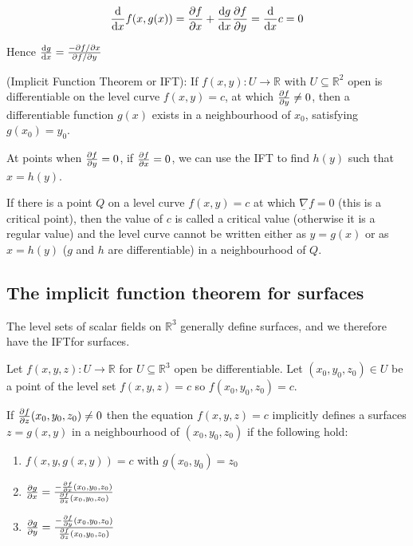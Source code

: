 \[\diff{}{x}f(x, g(x)) = \diffp{f}{x} + \diff{g}{x}\diffp{f}{y} = \diff{}{x}c = 0\]

Hence $\diff{g}{x} = \frac{- \partial f / \partial x}{\partial f / \partial y}$

\begin{theorem}
	(Implicit Function Theorem or IFT): If $f(x, y): U \rightarrow \mathbb{R}$ with $U \subseteq \mathbb{R}^2$ open is differentiable on the level curve $f(x, y) = c$, at which $\diffp{f}{y} \ne 0$, then a differentiable function $g(x)$ exists in a neighbourhood of $x_0$, satisfying $g(x_0) = y_0$.
\end{theorem}

\begin{remark}
	At points when $\diffp{f}{y} = 0$, if $\diffp{f}{x} = 0$, we can use the IFT to find $h(y)$ such that $x = h(y)$.
\end{remark}

\begin{remark}
	If there is a point $Q$ on a level curve $f(x, y) = c$ at which $\underline{\nabla} f = 0$ (this is a critical point), then the value of $c$ is called a critical value (otherwise it is a regular value) and the level curve cannot be written either as $y = g(x)$ or as $x = h(y)$ ($g$ and $h$ are differentiable) in a neighbourhood of $Q$.
\end{remark}

\subsection{The implicit function theorem for surfaces}

The level sets of scalar fields on $\mathbb{R}^3$ generally define surfaces, and we therefore have the IFTfor surfaces.

\begin{theorem}
	Let $f(x, y, z): U \rightarrow \mathbb{R}$ for $U \subseteq \mathbb{R}^3$ open be differentiable. Let $(x_0, y_0, z_0) \in U$ be a point of the level set $f(x, y, z) = c$ so $f(x_0, y_0, z_0) = c$.

	If $\diffp{f}{z} (x_0, y_0, z_0) \ne 0$ then the equation $f(x, y, z) = c$ implicitly defines a surfaces $z = g(x, y)$ in a neighbourhood of $(x_0, y_0, z_0)$ if the following hold:
	\begin{enumerate}
		\item $f(x, y, g(x, y)) = c$ with $g(x_0, y_0) = z_0$
		\item $\diffp{g}{x} = \frac{-\diffp{f}{x} (x_0, y_0, z_0)}{\diffp{f}{z} (x_0, y_0, z_0)}$
		\item $\diffp{g}{y} = \frac{-\diffp{f}{y} (x_0, y_0, z_0)}{\diffp{f}{z} (x_0, y_0, z_0)}$
	\end{enumerate}
\end{theorem}

